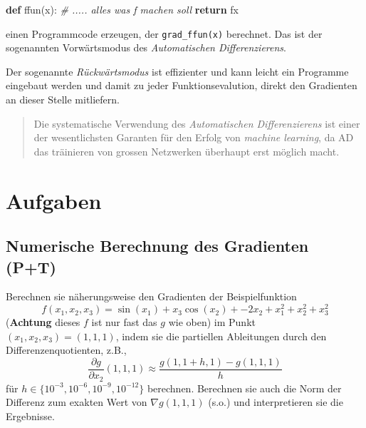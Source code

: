 \documentclass[]{book}
\newenvironment{Shaded}{\begin{snugshade}}{\end{snugshade}}
\newcommand{\CommentTok}[1]{\textcolor[rgb]{0.56,0.35,0.01}{\textit{#1}}}
\newcommand{\ControlFlowTok}[1]{\textcolor[rgb]{0.13,0.29,0.53}{\textbf{#1}}}
\newcommand{\KeywordTok}[1]{\textcolor[rgb]{0.13,0.29,0.53}{\textbf{#1}}}
\newcommand{\NormalTok}[1]{#1}
\newenvironment {JHSAYS} [0] {\begin{quote}\color{jhsc}} {\end{quote}}
\theoremstyle{definition}
\theoremstyle{definition}
\theoremstyle{definition}
\theoremstyle{definition}
\theoremstyle{remark}
\begin{document}
\begin{Shaded}
\begin{Highlighting}[]
\KeywordTok{def}\NormalTok{ ffun(x):}
    \CommentTok{# ..... alles was f machen soll}
    \ControlFlowTok{return}\NormalTok{ fx}
\end{Highlighting}
\end{Shaded}

einen Programmcode erzeugen, der \texttt{grad\_ffun(x)} berechnet. Das ist der sogenannten Vorwärtsmodus des \emph{Automatischen Differenzierens}.

Der sogenannte \emph{Rückwärtsmodus} ist effizienter und kann leicht ein Programme eingebaut werden und damit zu jeder Funktionsevalution, direkt den Gradienten an dieser Stelle mitliefern.

\begin{JHSAYS}
Die systematische Verwendung des \emph{Automatischen Differenzierens} ist einer der wesentlichsten Garanten für den Erfolg von \emph{machine learning}, da AD das träinieren von grossen Netzwerken überhaupt erst möglich macht.

\end{JHSAYS}

\hypertarget{aufgaben-4}{%
\section{Aufgaben}\label{aufgaben-4}}

\hypertarget{numerische-berechnung-des-gradienten-pt}{%
\subsection{Numerische Berechnung des Gradienten (P+T)}\label{numerische-berechnung-des-gradienten-pt}}

Berechnen sie näherungsweise den Gradienten der Beispielfunktion
\begin{equation*}
f(x_1, x_2, x_3) = \sin(x_1) + x_3\cos(x_2) + - 2x_2 + x_1^2 + x_2^2 + x_3^2
\end{equation*}
(\textbf{Achtung} dieses \(f\) ist nur fast das \(g\) wie oben)
im Punkt \((x_1, x_2, x_3) = (1, 1, 1)\),
indem sie die partiellen Ableitungen durch den Differenzenquotienten, z.B.,
\begin{equation*}
\frac{\partial g}{\partial x_2}(1, 1, 1) \approx \frac{g(1, 1+h, 1) - g(1, 1,1)}{h}
\end{equation*}
für \(h\in\{10^{-3}, 10^{-6}, 10^{-9}, 10^{-12}\}\) berechnen. Berechnen sie auch die Norm der Differenz zum exakten Wert von \(\nabla g(1, 1, 1)\) (s.o.) und interpretieren sie die Ergebnisse.
\end{document}
